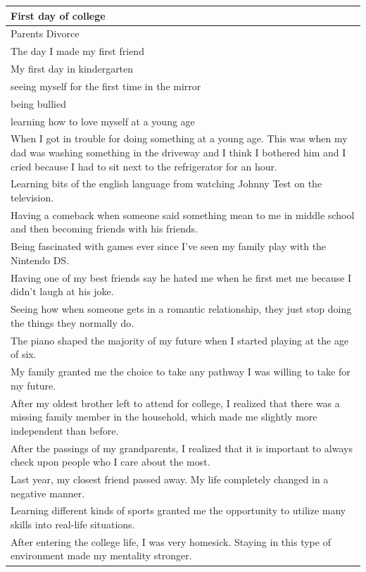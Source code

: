 \documentclass[
  .7em,
  letterpaper,
  DIV=11,
  numbers=noendperiod]{scrartcl}
\begin{document}
\begin{table}
\begin{tabular}{l}
\hline
First day of college\\
\hline
Parents Divorce\\
\hline
The day I made my first friend\\
\hline
My first day in kindergarten\\
\hline
seeing myself for the first time in the mirror\\
\hline
being bullied\\
\hline
learning how to love myself at a young age\\
\hline
When I got in trouble for doing something at a young age. This was when my dad was washing something in the driveway and I think I bothered him and I cried because I had to sit next to the refrigerator for an hour.\\
\hline
Learning bits of the english language from watching Johnny Test on the television.\\
\hline
Having a comeback when someone said something mean to me in middle school and then becoming friends with his friends.\\
\hline
Being fascinated with games ever since I've seen my family play with the Nintendo DS.\\
\hline
Having one of my best friends say he hated me when he first met me because I didn't laugh at his joke.\\
\hline
Seeing how when someone gets in a romantic relationship, they just stop doing the things they normally do.\\
\hline
The piano shaped the majority of my future when I started playing at the age of six.\\
\hline
My family granted me the choice to take any pathway I was willing to take for my future.\\
\hline
After my oldest brother left to attend for college, I realized that there was a missing family member in the household, which made me slightly more independent than before.\\
\hline
After the passings of my grandparents, I realized that it is important to always check upon people who I care about the most.\\
\hline
Last year, my closest friend passed away. My life completely changed in a negative manner.\\
\hline
Learning different kinds of sports granted me the opportunity to utilize many skills into real-life situations.\\
\hline
After entering the college life, I was very homesick. Staying in this type of environment made my mentality stronger.\\

\end{tabular}
\end{table}
\end{document}
